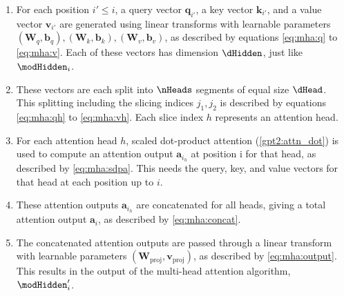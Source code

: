 \begin{enumerate}
	\item For each position $i' \leq i$, a query vector $\mathbf{q}_{i'}$, a key vector $\mathbf{k}_{i'}$, and a value vector $\mathbf{v}_{i'}$ are generated using linear transforms with learnable parameters $(\mathbf{W}_q, \mathbf{b}_q),(\mathbf{W}_k, \mathbf{b}_k), (\mathbf{W}_v, \mathbf{b}_v)$, as described by equations \eqref{eq:mha:q} to \eqref{eq:mha:v}. Each of these vectors has dimension $\dHidden$, just like $\modHidden_i$.
	
	\item These vectors are each split into $\nHeads$ segments of equal size $\dHead$. This splitting including the slicing indices $j_1, j_2$ is described by equations \eqref{eq:mha:qh} to \eqref{eq:mha:vh}. Each slice index $h$ represents an attention head.
	
	\item For each attention head $h$, scaled dot-product attention (\cref{gpt2:attn_dot}) is used to compute an attention output $\mathbf{a}_{i_h}$ at position i for that head, as described by \cref{eq:mha:sdpa}. This needs the query, key, and value vectors for that head at each position up to $i$.
	
	\item These attention outputs $\mathbf{a}_{i_h}$ are concatenated for all heads, giving a total attention output $\mathbf{a}_i$, as described by \cref{eq:mha:concat}.
	
	\item The concatenated attention outputs are passed through a linear transform with learnable parameters $(\mathbf{W}_{\mathrm{proj}}, \mathbf{v}_{\mathrm{proj}})$, as described by \cref{eq:mha:output}. This results in the output of the multi-head attention algorithm, $\modHidden'_i$.
\end{enumerate}


